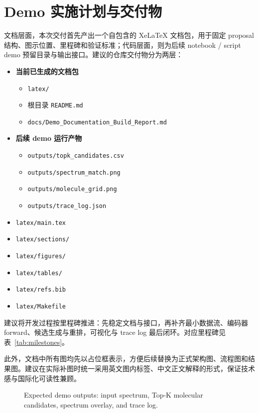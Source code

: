 \section{Demo 实施计划与交付物}
文档层面，本次交付首先产出一个自包含的 XeLaTeX 文档包，用于固定 proposal 结构、图示位置、里程碑和验证标准；代码层面，则为后续 notebook / script demo 预留目录与输出接口。建议的仓库交付物分为两层：
\begin{itemize}
  \item \textbf{当前已生成的文档包}
  \begin{itemize}
    \item \texttt{latex/}
    \item 根目录 \texttt{README.md}
    \item \texttt{docs/Demo\_Documentation\_Build\_Report.md}
  \end{itemize}
  \item \textbf{后续 demo 运行产物}
  \begin{itemize}
    \item \texttt{outputs/topk\_candidates.csv}
    \item \texttt{outputs/spectrum\_match.png}
    \item \texttt{outputs/molecule\_grid.png}
    \item \texttt{outputs/trace\_log.json}
  \end{itemize}
\end{itemize}

\begin{keybox}[建议目录视图]
\begin{itemize}
  \item \texttt{latex/main.tex}
  \item \texttt{latex/sections/}
  \item \texttt{latex/figures/}
  \item \texttt{latex/tables/}
  \item \texttt{latex/refs.bib}
  \item \texttt{latex/Makefile}
\end{itemize}
\end{keybox}

建议将开发过程按里程碑推进：先稳定文档与接口，再补齐最小数据流、编码器 forward、候选生成与重排，可视化与 trace log 最后闭环。对应里程碑见表~\ref{tab:milestones}。



此外，文档中所有图均先以占位框表示，方便后续替换为正式架构图、流程图和结果图。建议在实际补图时统一采用英文图内标签、中文正文解释的形式，保证技术感与国际化可读性兼顾。

\begin{figure}[htbp]
  \centering
  
  \caption{Expected demo outputs: input spectrum, Top-K molecular candidates, spectrum overlay, and trace log.}
\end{figure}
